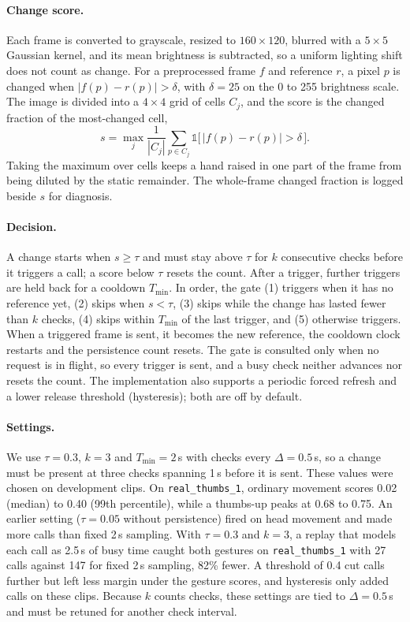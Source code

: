 \paragraph{Change score.}
Each frame is converted to grayscale, resized to $160\times120$, blurred with a $5\times5$ Gaussian kernel, and its mean brightness is subtracted, so a uniform lighting shift does not count as change.
For a preprocessed frame $f$ and reference $r$, a pixel $p$ is changed when $|f(p)-r(p)| > \delta$, with $\delta=25$ on the 0 to 255 brightness scale.
The image is divided into a $4\times4$ grid of cells $C_j$, and the score is the changed fraction of the most-changed cell,
\begin{equation}
  s = \max_j \frac{1}{|C_j|}\sum_{p\in C_j} \mathbb{1}\big[\,|f(p)-r(p)|>\delta\,\big].
  \label{eq:score}
\end{equation}
Taking the maximum over cells keeps a hand raised in one part of the frame from being diluted by the static remainder.
The whole-frame changed fraction is logged beside $s$ for diagnosis.

\paragraph{Decision.}
A change starts when $s \ge \tau$ and must stay above $\tau$ for $k$ consecutive checks before it triggers a call; a score below $\tau$ resets the count.
After a trigger, further triggers are held back for a cooldown $T_{\min}$.
In order, the gate (1) triggers when it has no reference yet, (2) skips when $s<\tau$, (3) skips while the change has lasted fewer than $k$ checks, (4) skips within $T_{\min}$ of the last trigger, and (5) otherwise triggers.
When a triggered frame is sent, it becomes the new reference, the cooldown clock restarts and the persistence count resets.
The gate is consulted only when no request is in flight, so every trigger is sent, and a busy check neither advances nor resets the count.
The implementation also supports a periodic forced refresh and a lower release threshold (hysteresis); both are off by default.

\paragraph{Settings.}
We use $\tau=0.3$, $k=3$ and $T_{\min}=2$\,s with checks every $\Delta=0.5$\,s, so a change must be present at three checks spanning 1\,s before it is sent.
These values were chosen on development clips.
On \texttt{real\_thumbs\_1}, ordinary movement scores 0.02 (median) to 0.40 (99th percentile), while a thumbs-up peaks at 0.68 to 0.75.
An earlier setting ($\tau=0.05$ without persistence) fired on head movement and made more calls than fixed 2\,s sampling.
With $\tau=0.3$ and $k=3$, a replay that models each call as 2.5\,s of busy time caught both gestures on \texttt{real\_thumbs\_1} with 27 calls against 147 for fixed 2\,s sampling, 82\% fewer.
A threshold of 0.4 cut calls further but left less margin under the gesture scores, and hysteresis only added calls on these clips.
Because $k$ counts checks, these settings are tied to $\Delta=0.5$\,s and must be retuned for another check interval.

